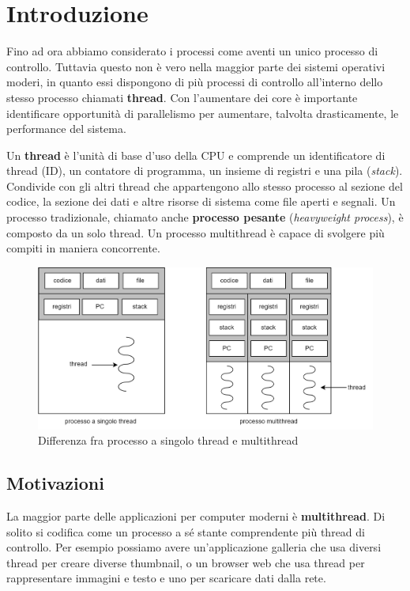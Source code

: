 \section{Introduzione}
    Fino ad ora abbiamo considerato i processi come aventi un unico processo di controllo. Tuttavia questo non è vero nella maggior parte dei sistemi operativi moderi, in quanto essi dispongono di più processi di controllo all'interno dello stesso processo chiamati \textbf{thread}. Con l'aumentare dei core è importante identificare opportunità di parallelismo per aumentare, talvolta drasticamente, le performance del sistema.
    
    Un \textbf{thread} è l'unità di base d'uso della CPU e comprende un identificatore di thread (ID), un contatore di programma, un insieme di registri e una pila (\textit{stack}). Condivide con gli altri thread che appartengono allo stesso processo al sezione del codice, la sezione dei dati e altre risorse di sistema come file aperti e segnali. Un processo tradizionale, chiamato anche \textbf{processo pesante} (\textit{heavyweight process}), è composto da un solo thread. Un processo multithread è capace di svolgere più compiti in maniera concorrente.
    
    \begin{figure}[h]
        \centering
        \includegraphics[width=1\textwidth]{img/threads.png}
        \caption{Differenza fra processo a singolo thread e multithread}
        \label{fig:my_label}
    \end{figure}
    
    \subsection{Motivazioni}
        La maggior parte delle applicazioni per computer moderni è \textbf{multithread}. Di solito si codifica come un processo a sé stante comprendente più thread di controllo. Per esempio possiamo avere un'applicazione galleria che usa diversi thread per creare diverse thumbnail, o un browser web che usa thread per rappresentare immagini e testo e uno per scaricare dati dalla rete.
        

